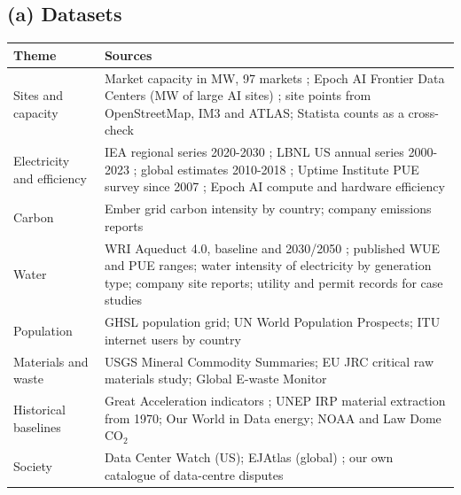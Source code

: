 \documentclass[10pt,a4paper]{article}
\begin{document}
\subsection*{(a) Datasets}
{\small
\begin{tabularx}{\textwidth}{@{}l X@{}}
\toprule
Theme & Sources \\
\midrule
Sites and capacity & Market capacity in MW, 97 markets \citep{cw2025}; Epoch AI Frontier Data Centers (MW of large AI sites) \citep{epochdc}; site points from OpenStreetMap, IM3 and ATLAS; Statista counts as a cross-check \citep{statista2026} \\
Electricity and efficiency & IEA regional series 2020-2030 \citep{iea2025}; LBNL US annual series 2000-2023 \citep{shehabi2024}; global estimates 2010-2018 \citep{masanet2020}; Uptime Institute PUE survey since 2007 \citep{uptime2026}; Epoch AI compute and hardware efficiency \\
Carbon & Ember grid carbon intensity by country; company emissions reports \\
Water & WRI Aqueduct 4.0, baseline and 2030/2050 \citep{aqueduct}; published WUE and PUE ranges; water intensity of electricity by generation type; company site reports; utility and permit records for case studies \\
Population & GHSL population grid; UN World Population Prospects; ITU internet users by country \\
Materials and waste & USGS Mineral Commodity Summaries; EU JRC critical raw materials study; Global E-waste Monitor \citep{balde2024} \\
Historical baselines & Great Acceleration indicators \citep{steffen2015}; UNEP IRP material extraction from 1970; Our World in Data energy; NOAA and Law Dome CO$_2$ \\
Society & Data Center Watch (US); EJAtlas (global) \citep{temper2015}; our own catalogue of data-centre disputes \\
\bottomrule
\end{tabularx}}
\end{document}
